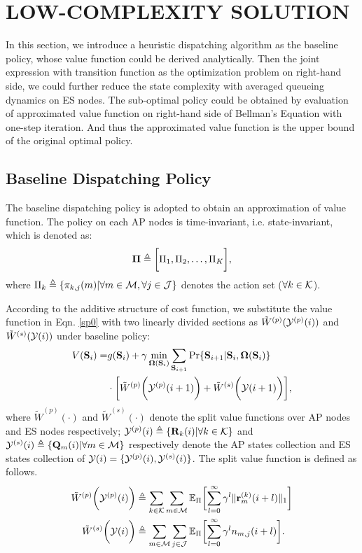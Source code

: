 \section{LOW-COMPLEXITY SOLUTION}
In this section, we introduce a heuristic dispatching algorithm as the baseline policy, whose value function could be derived analytically. Then the joint expression with transition function as the optimization problem on right-hand side, we could further reduce the state complexity with averaged queueing dynamics on ES nodes.
The sub-optimal policy could be obtained by evaluation of approximated value function on right-hand side of Bellman's Equation with one-step iteration. And thus the approximated value function is the upper bound of the original optimal policy.

\subsection{Baseline Dispatching Policy}
The baseline dispatching policy is adopted to obtain an approximation of value function. The policy on each AP nodes is time-invariant, i.e. state-invariant, which is denoted as:
\begin{align}
    \mathbf{\Pi} \triangleq \bigg[\Pi_1, \Pi_2, \dots, \Pi_K\bigg],
\end{align}
where $\Pi_k \triangleq \{\pi_{k,j}(m)|\forall m\in\mathcal{M},\forall j\in\mathcal{J}\}$ denotes the action set ($\forall k\in\mathcal{K}$).

According to the additive structure of cost function, we substitute the value function in Eqn. \ref{sp0} with two linearly divided sections as $\tilde{W}^{(p)}(\mathcal{Y}^{(p)}(i))$ and $\tilde{W}^{(s)}(\mathcal{Y}(i))$ under baseline policy:
\begin{align}
    V(\mathbf{S}_{i}) =& 
        g(\mathbf{S}_{i}) + \gamma \min_{\boldsymbol{\Omega}(\mathbf{S}_{i})} \sum_{\mathbf{S}_{i+1}} \Pr\{ \mathbf{S}_{i+1}|\mathbf{S}_{i}, \boldsymbol{\Omega}(\mathbf{S}_{i}) \}
        \nonumber\\
        & \cdot \bigg[ \tilde{W}^{(p)}\bigg(\mathcal{Y}^{(p)}(i+1)\bigg) + \tilde{W}^{(s)}\bigg(\mathcal{Y}(i+1)\bigg) \bigg],
\end{align}
where $\tilde{W}^{(p)}(\cdot)$ and $\tilde{W}^{(s)}(\cdot)$ denote the split value functions over AP nodes and ES nodes respectively; $\mathcal{Y}^{(p)}(i) \triangleq \{\mathbf{R}_k(i)|\forall k\in\mathcal{K}\}$ and $\mathcal{Y}^{(s)}(i) \triangleq \{\mathbf{Q}_m(i)|\forall m\in\mathcal{M}\}$ respectively denote the AP states collection and ES states collection of $\mathcal{Y}(i) = \{\mathcal{Y}^{(p)}(i), \mathcal{Y}^{(s)}(i)\}$. The split value function is defined as follows.
\begin{align}
    \tilde{W}^{(p)}\Paren{\Obsv^{(p)}(i)} &\define \sum_{k\in\apSet}\sum_{m\in\esSet}
        \mathbb{E}_{\Pi}\Bracket{
            \sum_{l=0}^{\infty} \gamma^{l} \Inorm{\vec{r}^{(k)}_{m}(i+l)}
        }
    \\
    \tilde{W}^{(s)}\Paren{\Obsv(i)} &\define \sum_{m\in\esSet}\sum_{j\in\jSpace}
        \mathbb{E}_{\Pi}\Bracket{
            \sum_{l=0}^{\infty} \gamma^{l} n_{m,j}(i+l)
        }.
\end{align}
        
